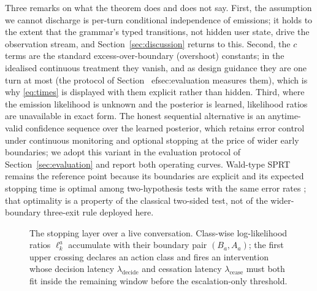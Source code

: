 Three remarks on what the theorem does and does not say.
First, the assumption we cannot discharge is per-turn conditional independence of emissions; it holds to the extent that the grammar's typed transitions, not hidden user state, drive the observation stream, and Section~\ref{sec:discussion} returns to this.
Second, the $c$ terms are the standard excess-over-boundary (overshoot) constants; in the idealised continuous treatment they vanish, and as design guidance they are one turn at most (the protocol of Section~
ef{sec:evaluation} measures them), which is why \eqref{eq:times} is displayed with them explicit rather than hidden.
Third, where the emission likelihood is unknown and the posterior is learned, likelihood ratios are unavailable in exact form.
The honest sequential alternative is an anytime-valid confidence sequence over the learned posterior, which retains error control under continuous monitoring and optional stopping \citep{howard2021time} at the price of wider early boundaries; we adopt this variant in the evaluation protocol of Section~\ref{sec:evaluation} and report both operating curves.
Wald-type SPRT remains the reference point because its boundaries are explicit and its expected stopping time is optimal among two-hypothesis tests with the same error rates \citep{waldwolfowitz1948optimality}; that optimality is a property of the classical two-sided test, not of the wider-boundary three-exit rule deployed here.

\begin{figure}[t]
  \centering
  \resizebox{\linewidth}{!}{%
  }
  \caption{The stopping layer over a live conversation.
           Class-wise log-likelihood ratios $\ell_k^{a}$ accumulate with their boundary pair
           $(B_a, A_a)$; the first upper crossing declares an action class and fires an
           intervention whose decision latency $\lambda_{\mathrm{decide}}$ and cessation
           latency $\lambda_{\mathrm{cease}}$ must both fit inside the remaining window
           before the escalation-only threshold.}
  \label{fig:stopping}
\end{figure}


